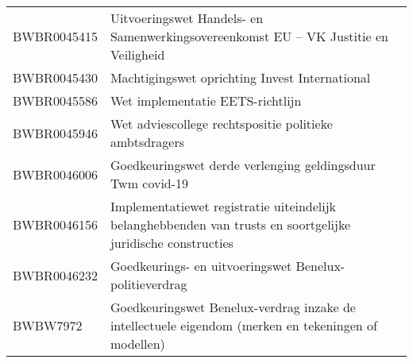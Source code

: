 \begin{longtable}{lp{}}
BWBR0045415 & Uitvoeringswet Handels- en Samenwerkingsovereenkomst EU – VK Justitie en Veiligheid \\
BWBR0045430 & Machtigingswet oprichting Invest International \\
BWBR0045586 & Wet implementatie EETS-richtlijn \\
BWBR0045946 & Wet adviescollege rechtspositie politieke ambtsdragers \\
BWBR0046006 & Goedkeuringswet derde verlenging geldingsduur Twm covid-19 \\
BWBR0046156 & Implementatiewet registratie uiteindelijk belanghebbenden van trusts en soortgelijke juridische constructies \\
BWBR0046232 & Goedkeurings- en uitvoeringswet Benelux-politieverdrag \\
BWBW7972 & Goedkeuringswet Benelux-verdrag inzake de intellectuele eigendom (merken en tekeningen of modellen) \\
\end{longtable}
